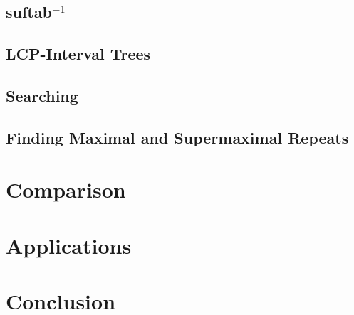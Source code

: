 \documentclass[a4paper,10pt]{article}
\begin{document}
\subsection*{suftab$^{-1}$}


\subsection*{LCP-Interval Trees}

\subsection*{Searching}

\subsection*{Finding Maximal and Supermaximal Repeats}

\section*{Comparison}

\section*{Applications}

\section*{Conclusion}



\end{document}
